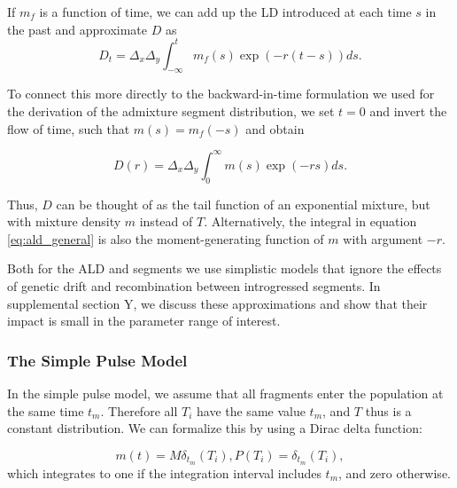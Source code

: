 \documentclass[11pt]{article}
\begin{document}
If $m_f$ is a function of time, we can add up the LD introduced at each time $s$ in the past and approximate $D$ as 
\begin{equation}
    D_t = \Delta_x\Delta_y\int_{-\infty}^t m_f(s)\exp(-r(t-s)) ds \text{.} \label{eq:ld_general_bwd}
\end{equation}

To connect this more directly to the backward-in-time formulation we used for the derivation of the admixture segment distribution, we set $t=0$ and invert the flow of time, such that $m(s) = m_f(-s)$ and obtain

\begin{equation}
    D(r) = \Delta_x\Delta_y\int_0^{\infty} m(s)\exp(-rs) ds \text{.} \label{eq:ld_general}
\end{equation}

Thus, $D$ can be thought of as the tail function of an exponential mixture, but with mixture density $m$ instead of $T$. Alternatively, the integral in equation \ref{eq:ald_general} is also the moment-generating function of $m$ with argument $-r$. 

Both for the ALD and segments we use simplistic models that ignore the effects of genetic drift and recombination between introgressed segments. In supplemental section Y, we discuss these approximations and show that their impact is small in the parameter range of interest.




\subsubsection{The Simple Pulse Model}\label{The Simple Pulse Model}
	
	
In the simple pulse model, we assume that all fragments enter the population at the same time $t_m$. Therefore all $T_i$ have the same value $t_m$, and $T$ thus is a constant distribution. We can formalize this by using a Dirac delta function:

\begin{subequations}
\begin{equation}
\label{eq:RV_simple_pulse}
	m(t)=  M\delta_{t_m}(T_i),
\end{equation} 
	
\begin{equation}
\label{eq:RV_simple_pulse}
	P(T_i)=\delta_{t_m}(T_i),
\end{equation} 
\end{subequations}
which integrates to one if the integration interval includes $t_m$, and zero otherwise.
\end{document}
